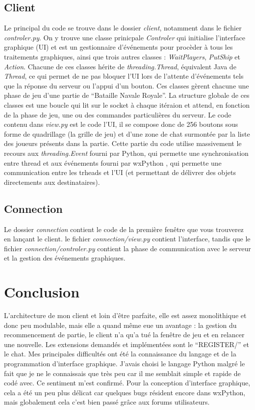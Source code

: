 \documentclass[a4paper, 11pt]{report}
\begin{document}
\subsection{Client}
Le principal du code se trouve dans le dossier \emph{client}, notamment dans le fichier \emph{controler.py}.
On y trouve une classe prinicpale \emph{Controler} qui initialise l'interface graphique (UI) et est un gestionnaire d'événements pour procèder à tous les traitements graphiques, 
ainsi que trois autres classes : 
\emph{WaitPlayers}, \emph{PutShip} et \emph{Action}. Chacune de ces classes hérite de \emph{threading.Thread}, équivalent Java de 
\emph{Thread}, ce qui permet de ne pas bloquer l'UI lors de l'attente d'événements tels que la réponse du serveur ou l'appui d'un bouton. 
Ces classes gèrent chacune une phase de jeu d'une partie de ``Bataille Navale Royale''.
La structure globale de ces classes est une boucle qui lit sur le socket à chaque itéraion et attend, en fonction de la phase de jeu, une ou des commandes particulières du serveur. 
\newline
Le code contenu dans \emph{view.py} est le code l'UI, il se compose donc de 256 boutons sous forme de quadrillage (la grille de jeu) et d'une zone de chat surmontée par la liste 
des joueurs présents dans la partie.
\newline
Cette partie du code utilise massivement le recours aux \emph{threading.Event} fourni par Python, qui permette une synchronisation entre thread et 
aux événements fourni par wxPython , qui permette une communication entre les trheads et l'UI (et permettant de délivrer des objets directements aux 
destinataires).

\subsection{Connection}
Le dossier \emph{connection} contient le code de la première fenêtre que vous trouverez en lançant le client. 
le fichier \emph{connection/view.py} contient l'interface, tandis que le fichier \emph{connection/controler.py} contient 
la phase de communication avec le serveur et la gestion des événements graphiques.

\section{Conclusion}
L'architecture de mon client et loin d'être parfaite, elle est assez monolithique et donc peu modulable, mais elle a quand même eue un avantage :
la gestion du recommencement de partie, le client n'a qu'a tué la fenêtre de jeu et en relancer une nouvelle.
Les extensions demandés et implémentées sont le ``REGISTER/'' et le chat.
\newline
Mes principales difficultés ont été la connaissance du langage et de la programmation d'interface graphique. 
J'avais choisi le langage Python malgré le fait que je ne le connaissais que très peu car il me semblait simple et rapide de codé avec. 
Ce sentiment m'est confirmé. Pour la conception d'interface graphique, cela a été un peu plus délicat car quelques bugs résident encore dans 
wxPython, mais globalement cela c'est bien passé grâce aux forums utilisateurs.
\end{document}
